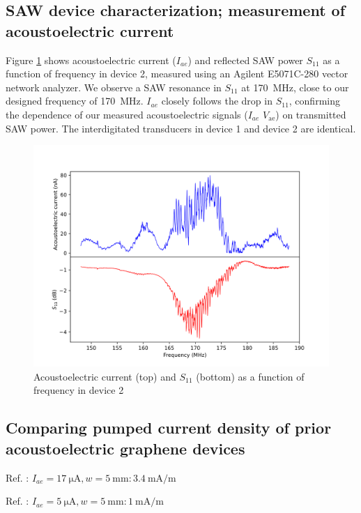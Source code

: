 \documentclass[double,12pt,1in,seploa]{beavtex}
\let\Oldsubsection\subsection
\renewcommand{\subsection}{\FloatBarrier\Oldsubsection}
\begin{document}
\subsection{SAW device characterization; measurement of acoustoelectric current} 
Figure \ref{AECP Figure S3} shows acoustoelectric current ($I_{ae}$) and reflected SAW power $S_{11}$ as a function of frequency in device 2, measured using an Agilent E5071C-280 vector network analyzer. We observe a SAW resonance in $S_{11}$ at \SI{170}{\mega\hertz}, close to our designed frequency of \SI{170}{\mega\hertz}.  $I_{ae}$ closely follows the drop in $S_{11}$, confirming the dependence of our measured acoustoelectric signals ($I_{ae}$ $V_{\mathrm{ae}}$) on transmitted SAW power. The interdigitated transducers in device 1 and device 2 are identical.

\begin{figure}
    \includegraphics[width = 1\textwidth]{Figure S3, AEC vs S11.png}
    \caption{Acoustoelectric current (top) and $S_{11}$ (bottom) as a function of frequency in device 2}
    \label{AECP Figure S3}
\end{figure}

\subsection{Comparing pumped current density of prior acoustoelectric graphene devices}

Ref. \cite{okuda_graphene_2018}: $I_{ae} = \SI{17}{\micro \ampere}, w = \SI{5}{\milli\meter}: \SI{3.4}{\milli \ampere/\meter}$

\noindent
Ref. \cite{okuda_acoustic_2016}: $I_{ae} = \SI{5}{\micro \ampere}, w = \SI{5}{\milli\meter}: \SI{1}{\milli \ampere/\meter}$
\end{document}
